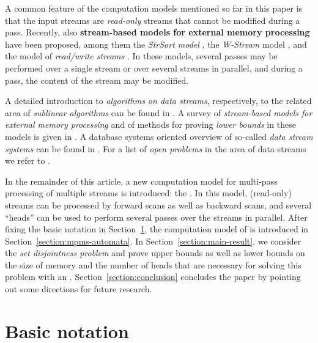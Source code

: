 \documentclass[proceedings]{stacs}
\theoremstyle{plain}\newtheorem{satz}[thm]{Satz}
\theoremstyle{definition}\newtheorem{crucial}[thm]{Crucial Definition}
\newcommand{\aut}{\text{mp2s-automaton}}
\newcommand{\auta}{\text{mp2s-automata}}
\begin{document}
A common feature of the computation models mentioned so far in this paper is that the
input streams are \emph{read-only} streams that cannot be modified during a
pass. Recently, also
\textbf{stream-based models for external memory processing}
have been proposed, among them 
the \emph{StrSort model} \cite{aggdatrajruh04,Ruhl-PhD}, 
the \emph{W-Stream} model \cite{WStream-Paper}, and the
model of \emph{read/write streams} 
\cite{groschwe05a,grokocschwe05a,groherschwe06,BJR-STOC07,BH-FOCS08}.
In these models, several passes may be performed over a single stream or over
several streams in parallel, and during a pass, the content of the stream may be
modified.
\\
\par

A detailed introduction to \emph{algorithms on data streams}, respectively, to the 
related area of \emph{sublinear algorithms} can be found in
\cite{Muthukrishnan-DataStream-Algos,ChristianSohler-Survey}.
A survey of \emph{stream-based models for external memory processing} and of 
methods for proving 
\emph{lower bounds} in these models is given in \cite{Schweikardt-PODS07survey}.
A database systems oriented overview of so-called \emph{data stream systems} can
be found in \cite{bbdmw02}.
For a list of \emph{open problems} in the area of data streams we refer to
\cite{Kanpur-2006-ListOfOpenProblems}.
\\
\par

In the remainder of this article, a new computation model for multi-pass processing
of multiple streams is introduced: the \emph{\auta{}}. 
In this model,
(read-only) streams can be processed by forward scans as well as 
backward scans, and several ``heads'' can be used to perform several passes 
over the streams in parallel. 
After fixing the basic notation in Section~\ref{section:preliminaries}, the computation
model of \auta{} is introduced in Section~\ref{section:mpms-automata}.
In Section~\ref{section:main-result}, we consider the \emph{set disjointness problem} 
and prove upper bounds as well as lower bounds
on the size of memory and the number of heads that are necessary for solving
this problem with an \aut{}.
Section~\ref{section:conclusion} concludes the paper by pointing out some directions
for future research.


\section{Basic notation}\label{section:preliminaries}
\end{document}
